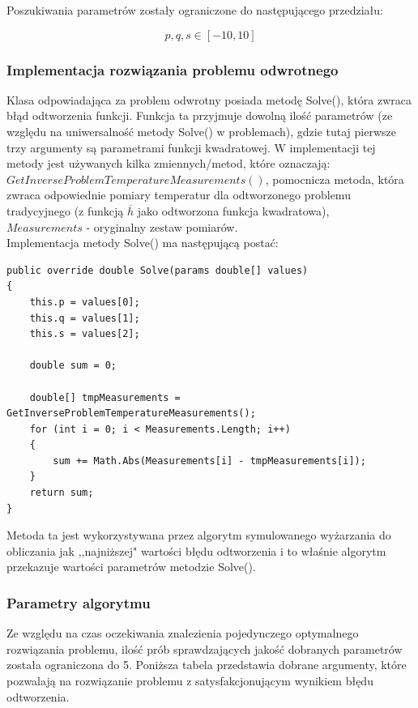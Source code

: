 \documentclass[twoside]{projektInzynierskiMS1}
\newcommand{\si}{ś}
\begin{document}
Poszukiwania parametrów zostały ograniczone do następującego przedziału:

\[ p, q, s \in [-10, 10] \]

\subsubsection{Implementacja rozwiązania problemu odwrotnego}

Klasa odpowiadająca za problem odwrotny posiada metodę Solve(), która zwraca błąd odtworzenia funkcji. Funkcja ta przyjmuje dowolną ilo\si ć parametrów (ze względu na uniwersalno\si ć metody Solve() w problemach), gdzie tutaj pierwsze trzy argumenty są parametrami funkcji kwadratowej. W implementacji tej metody jest używanych kilka zmiennych/metod, które oznaczają:\\

\noindent $GetInverseProblemTemperatureMeasurements()$, pomocnicza metoda, która zwraca odpowiednie pomiary temperatur dla odtworzonego problemu tradycyjnego (z funkcją $\overline{h}$ jako odtworzona funkcja kwadratowa), \\
\noindent $Measurements$ - oryginalny zestaw pomiarów. \\

Implementacja metody Solve() ma następującą postać:

\begin{verbatim}
public override double Solve(params double[] values)
{
    this.p = values[0];
    this.q = values[1];
    this.s = values[2];

    double sum = 0;

    double[] tmpMeasurements = GetInverseProblemTemperatureMeasurements();
    for (int i = 0; i < Measurements.Length; i++)
    {
        sum += Math.Abs(Measurements[i] - tmpMeasurements[i]);
    }
    return sum;
}
\end{verbatim}

Metoda ta jest wykorzystywana przez algorytm symulowanego wyżarzania do obliczania jak ,,najniższej" warto\si ci błędu odtworzenia i to wła\si nie algorytm przekazuje warto\si ci parametrów metodzie Solve().

\subsubsection{Parametry algorytmu}
Ze względu na czas oczekiwania znalezienia pojedynczego optymalnego rozwiązania problemu, ilo\si ć prób sprawdzających jako\si ć dobranych parametrów została ograniczona do 5. Poniższa tabela przedstawia dobrane argumenty, które pozwalają na rozwiązanie problemu z satysfakcjonującym wynikiem błędu odtworzenia. \\
\end{document}
